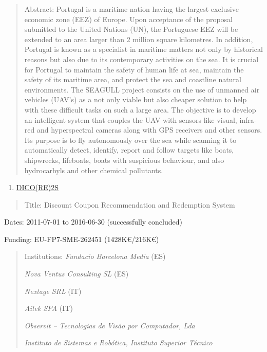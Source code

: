 \documentclass[
]{article}
\begin{document}
\begin{quote}
Abstract: Portugal is a maritime nation having the largest exclusive
economic zone (EEZ) of Europe. Upon acceptance of the proposal submitted
to the United Nations (UN), the Portuguese EEZ will be extended to an
area larger than 2 million square kilometres. In addition, Portugal is
known as a specialist in maritime matters not only by historical reasons
but also due to its contemporary activities on the sea. It is crucial
for Portugal to maintain the safety of human life at sea, maintain the
safety of its maritime area, and protect the sea and coastline natural
environments. The SEAGULL project consists on the use of unmanned air
vehicles (UAV's) as a not only viable but also cheaper solution to help
with these difficult tasks on such a large area. The objective is to
develop an intelligent system that couples the UAV with sensors like
visual, infra-red and hyperspectral cameras along with GPS receivers and
other sensors. Its purpose is to fly autonomously over the sea while
scanning it to automatically detect, identify, report and follow targets
like boats, shipwrecks, lifeboats, boats with suspicious behaviour, and
also hydrocarbyls and other chemical pollutants.
\end{quote}

\begin{enumerate}
\def\labelenumi{\arabic{enumi}.}
\setcounter{enumi}{4}
\item
  \ul{DICO(RE)2S}
\end{enumerate}

\begin{quote}
Title: Discount Coupon Recommendation and Redemption System
\end{quote}

Dates: 2011-07-01 to 2016-06-30 (successfully concluded)

Funding: EU-FP7-SME-262451 (1428K€/216K€)

\begin{quote}
Institutions: \emph{Fundacio Barcelona Media} (ES)

\emph{Nova Ventus Consulting SL} (ES)

\emph{Nextage SRL} (IT)

\emph{Aitek SPA} (IT)

\emph{Observit -- Tecnologias de Visão por Computador, Lda}

\emph{Instituto de Sistemas e Robótica, Instituto Superior Técnico}
\end{quote}
\end{document}
